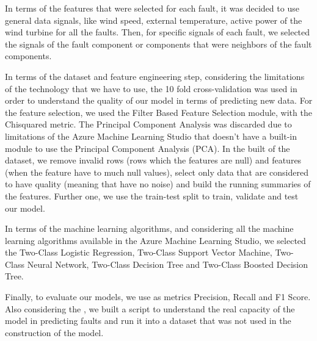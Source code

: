 
In terms of the features that were selected for each fault, it was decided to use general data signals, like wind speed, external temperature, active power of the wind turbine for all the faults. Then, for specific signals of each fault, we selected the signals of the fault component or components that were neighbors of the fault components.

In terms of the dataset and feature engineering step, considering the limitations of the technology that we have to use, the 10 fold cross-validation was used in order to understand the quality of our model in terms of predicting new data. For the feature selection, we used the Filter Based Feature Selection module, with the Chisquared metric. The Principal Component Analysis was discarded due to limitations of the Azure Machine Learning Studio that doesn't have a built-in module to use the Principal Component Analysis (PCA). In the built of the dataset, we remove invalid rows (rows which the features are null) and features (when the feature have to much null values), select only data that are considered to have quality (meaning that have no noise) and build the running summaries of the features. Further one, we use the train-test split to train, validate and test our model.

In terms of the machine learning algorithms, and considering all the machine learning algorithms available in the Azure Machine Learning Studio, we selected the Two-Class Logistic Regression, Two-Class Support Vector Machine, Two-Class Neural Network, Two-Class Decision Tree and Two-Class Boosted Decision Tree.

Finally, to evaluate our models, we use as metrics Precision, Recall and F1 Score. Also considering the \cite{MED_1}, we built a script to understand the real capacity of the model in predicting faults and run it into a dataset that was not used in the construction of the model.